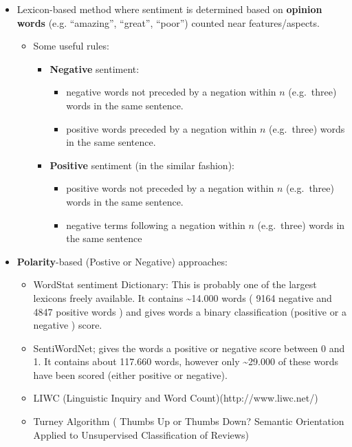 \documentclass[11pt]{article}
\providecommand{\tightlist}{%
      \setlength{\itemsep}{0pt}\setlength{\parskip}{0pt}}
\begin{document}
\begin{itemize}
\tightlist
\item
  Lexicon-based method where sentiment is determined based on
  \textbf{opinion words} (e.g. ``amazing'', ``great'', ``poor'') counted
  near features/aspects.

  \begin{itemize}
  \tightlist
  \item
    Some useful rules:

    \begin{itemize}
    \tightlist
    \item
      \textbf{Negative} sentiment:

      \begin{itemize}
      \tightlist
      \item
        negative words not preceded by a negation within \(n\)
        (e.g.~three) words in the same sentence.
      \item
        positive words preceded by a negation within \(n\) (e.g.~three)
        words in the same sentence.
      \end{itemize}
    \item
      \textbf{Positive} sentiment (in the similar fashion):

      \begin{itemize}
      \tightlist
      \item
        positive words not preceded by a negation within \(n\)
        (e.g.~three) words in the same sentence.
      \item
        negative terms following a negation within \(n\) (e.g.~three)
        words in the same sentence
      \end{itemize}
    \end{itemize}
  \end{itemize}
\item
  \textbf{Polarity}-based (Postive or Negative) approaches:

  \begin{itemize}
  \tightlist
  \item
     WordStat sentiment Dictionary: This is probably one of the largest
    lexicons freely available. It contains \textasciitilde{}14.000 words
    ( 9164 negative and 4847 positive words ) and gives words a binary
    classification (positive or a negative ) score.
  \item
     SentiWordNet; gives the words a positive or negative score between
    0 and 1. It contains about 117.660 words, however only
    \textasciitilde{}29.000 of these words have been scored (either
    positive or negative).
  \item
    LIWC (Linguistic Inquiry and Word Count)(http://www.liwc.net/)
  \item
    Turney Algorithm ( Thumbs Up or Thumbs Down? Semantic Orientation
    Applied to Unsupervised Classification of Reviews)


\end{itemize}
\end{itemize}
\end{document}
